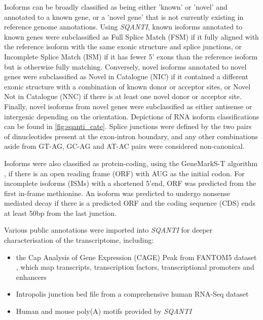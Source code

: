 Isoforms can be broadly classified as being either 'known' or 'novel' and annotated to a known gene, or a 'novel gene' that is not currently existing in reference genome annotations. Using \textit{SQANTI}, known isoforms annotated to known genes were subclassified as Full Splice Match (FSM) if it fully aligned with the reference isoform with the same exonic structure and splice junctions, or Incomplete Splice Match (ISM) if it has fewer 5’ exons than the reference isoform but is otherwise fully matching. Conversely, novel isoforms annotated to novel genes were subclassified as Novel in Catalogue (NIC) if it contained a different exonic structure with a combination of known donor or acceptor sites, or Novel Not in Catalogue (NNC) if there is at least one novel donor or acceptor site. Finally, novel isoforms from novel genes were subclassified as either antisense or intergenic depending on the orientation. Depictions of RNA isoform classifications can be found in \cref{fig:sqanti_cate}. Splice junctions were defined by the two pairs of dinucleotides present at the exon-intron boundary, and any other combinations aside from GT-AG, GC-AG and AT-AC pairs were considered non-canonical. 

Isoforms were also classified as protein-coding, using the GeneMarkS-T algorithm \cite{Tang2015}, if there is an open reading frame (ORF) with AUG as the initial codon. For incomplete isoforms (ISMs) with a shortened 5'end, ORF was predicted from the first in-frame methionine. An isoform was predicted to undergo nonsense mediated decay if there is a predicted ORF and the coding sequence (CDS) ends at least 50bp from the last junction. 

Various public annotations were imported into \textit{SQANTI} for deeper characterisation of the transcriptome, including:
\begin{itemize}
	\item the Cap Analysis of Gene Expression (CAGE) Peak from FANTOM5 dataset \cite{Lizio2019}, which map transcripts, transcription factors, transcriptional promoters and enhancers
	\item Intropolis junction bed file\cite{Nellore2016} from a comprehensive human RNA-Seq dataset
	\item Human and mouse poly(A) motifs provided by \textit{SQANTI}	 
\end{itemize}

